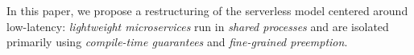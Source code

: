 In this paper, we propose a restructuring of the serverless model centered around
low-latency: \textit{lightweight microservices} run in \textit{shared processes}
and are isolated primarily using \textit{compile-time guarantees} and
\textit{fine-grained preemption}.



